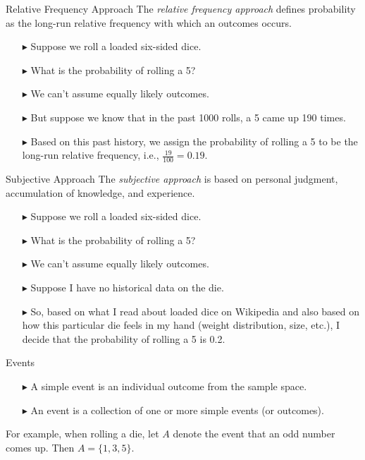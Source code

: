 \documentclass[12pt]{beamer}
\begin{document}
\begin{frame}{Relative Frequency Approach}
	The {\sl relative frequency approach} defines probability as the long-run relative frequency with which an outcomes occurs.
	\begin{itemize}
		\item[$\blacktriangleright$] Suppose we roll a {\color{red}loaded} six-sided dice.
		\item[$\blacktriangleright$] What is the probability of rolling a 5?
		\item[$\blacktriangleright$] We can't assume equally likely outcomes.
		\item[$\blacktriangleright$] But suppose we know that in the past 1000 rolls, a 5 came up 190 times.
		\item[$\blacktriangleright$] Based on this past history, we assign the probability of rolling a 5 to be the long-run relative frequency, i.e., $\frac{19}{100}=0.19$.
	\end{itemize}
\end{frame}
\begin{frame}{Subjective Approach}
	The {\sl subjective approach} is based on personal judgment, accumulation of knowledge, and experience.
	\begin{itemize}
		\item[$\blacktriangleright$] Suppose we roll a {\color{red}loaded} six-sided dice.
		\item[$\blacktriangleright$] What is the probability of rolling a 5?
		\item[$\blacktriangleright$] We can't assume equally likely outcomes.
		\item[$\blacktriangleright$] Suppose I have no historical data on the die.
		\item[$\blacktriangleright$] So, based on what I read about loaded dice on Wikipedia and also based on how this particular die feels in my hand (weight distribution, size, etc.), I decide that the probability of rolling a 5 is 0.2.
	\end{itemize}
\end{frame}
\begin{frame}{Events}
	\begin{itemize}
		\item[$\blacktriangleright$] A simple event is an individual outcome from the sample space.
		\item[$\blacktriangleright$] An event is a collection of one or more simple events (or outcomes).
	\end{itemize}
For example, when rolling a die, let $A$ denote the event that an odd number comes up. Then $A=\{1,3,5\}$.
\end{frame}
\end{document}
